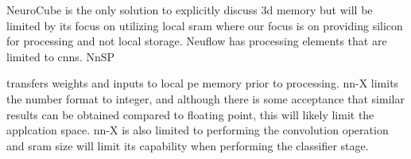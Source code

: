 {{{\iffalse
The current state-of-the-art does not:
\begin{outline}
  \1 currently propose streaming data directly from \ac{3ddram} through the processing functions to avoid the use of large local memory
  \1 propose data structures to support continuous streaming from \ac{dram}
  \1 propose a 3D-stack supporting more than one processing layer
\end{outline}
\fi

\iffalse
\begin{figure}
\centering
\begin{subfigure}{.45\textwidth}
  \centering
  \texttt{[image: kim2016neurocube\_fig4]}
  \captionsetup{justification=centering, skip=6pt}
  \caption{NeuroCube}
  \label{fig:NeuroCubeDie}
\end{subfigure}%
\begin{subfigure}{.45\textwidth}
  \centering
  \texttt{[image: chen2014diannao\_fig15]}
  \captionsetup{justification=centering, skip=10pt}
  \caption{Diannao (SB and NBx are \ac{sram})}
  \label{fig:DiannaoDie}
\end{subfigure}
\captionsetup{justification=centering, skip=3pt}
\caption{Example state-of-the-art die}
\label{fig:Example state-of-the-art die}
\end{figure}
\fi


\iffalse

NeuroCube\cite{kim2016neurocube} is the only solution to explicitly discuss \ac{3d} memory but will be limited by its focus on utilizing local \ac{sram} where our focus is on
providing silicon for processing and not local storage.
Neuflow\cite{farabet2011neuflow} has processing elements that are limited to \acp{cnn}.
NnSP{\cite{esmaeilzadeh2005nnsp} transfers weights and inputs to local \ac{pe} memory prior to processing.
nn-X\cite{gokhale2014240} limits the number format to integer, and although there is some acceptance that similar
results can be obtained compared to floating point, this will likely limit the applcation space. 
nn-X is also limited to performing the convolution operation and \ac{sram} size will limit its capability when performing the classifier stage.

}}}}
